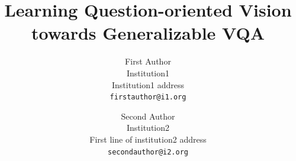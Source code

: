\documentclass[10pt,twocolumn,letterpaper]{article}
\begin{document}
\title{Learning Question-oriented Vision towards Generalizable VQA}

\author{First Author\\
Institution1\\
Institution1 address\\
{\tt\small firstauthor@i1.org}
\and
Second Author\\
Institution2\\
First line of institution2 address\\
{\tt\small secondauthor@i2.org}
}

\maketitle
\end{document}
